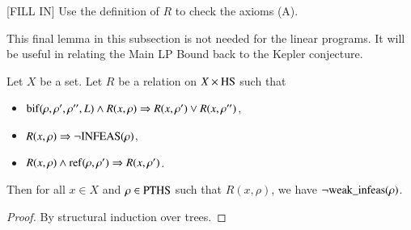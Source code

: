 [FILL IN]  Use the definition of $R$ to check the axioms (A).



This final lemma in this subsection is not needed for the linear
programs. It will be useful in relating the Main LP Bound back to
the Kepler conjecture.

\begin{lemma}  Let $X$ be a set.  Let $R$ be a relation on
$X\times {\operatorname{HS}}$ such that
    \begin{itemize}
    \item ${\operatorname{bif}}(\rho,\rho',\rho'',L) \wedge R(x,\rho)\Rightarrow
      R(x,\rho') \vee R(x,\rho'')$,
    \item $R(x,\rho) \Rightarrow \neg {\operatorname{INFEAS}}(\rho)$,
    \item $R(x,\rho) \wedge {\operatorname{ref}}(\rho,\rho') \Rightarrow
    R(x,\rho')$.
    \end{itemize}
Then for all $x\in X$ and $\rho\in{\operatorname{PTHS}}$ such that
$R(x,\rho)$, we have $\neg {\operatorname{weak\_infeas}}(\rho)$.
\end{lemma}

\begin{proof} By structural induction over trees.
\end{proof}
